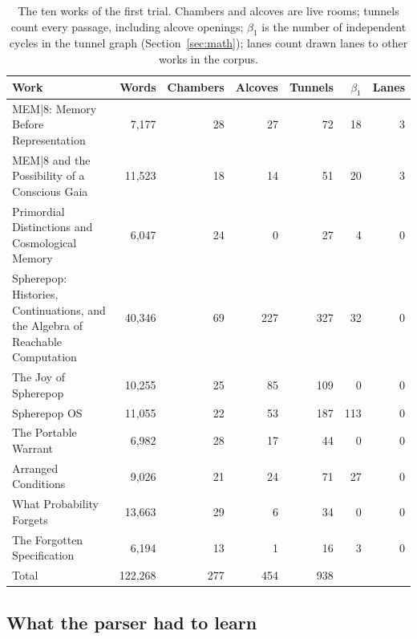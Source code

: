 \documentclass[11pt]{article}
\theoremstyle{remark}
\begin{document}
\begin{table}[htbp]
\centering\small
\begin{tabularx}{\linewidth}{>{\raggedright\arraybackslash}Xrrrrrr}
\toprule
Work & Words & Chambers & Alcoves & Tunnels & $\beta_1$ & Lanes \\
\midrule
MEM|8: Memory Before Representation & 7,177 & 28 & 27 & 72 & 18 & 3 \\
MEM|8 and the Possibility of a Conscious Gaia & 11,523 & 18 & 14 & 51 & 20 & 3 \\
Primordial Distinctions and Cosmological Memory & 6,047 & 24 & 0 & 27 & 4 & 0 \\
Spherepop: Histories, Continuations, and the Algebra of Reachable Computation & 40,346 & 69 & 227 & 327 & 32 & 0 \\
The Joy of Spherepop & 10,255 & 25 & 85 & 109 & 0 & 0 \\
Spherepop OS & 11,055 & 22 & 53 & 187 & 113 & 0 \\
The Portable Warrant & 6,982 & 28 & 17 & 44 & 0 & 0 \\
Arranged Conditions & 9,026 & 21 & 24 & 71 & 27 & 0 \\
What Probability Forgets & 13,663 & 29 & 6 & 34 & 0 & 0 \\
The Forgotten Specification & 6,194 & 13 & 1 & 16 & 3 & 0 \\
\midrule
Total & 122,268 & 277 & 454 & 938 & & \\
\bottomrule
\end{tabularx}
\caption{The ten works of the first trial. Chambers and alcoves are live rooms; tunnels count every passage, including alcove openings; $\beta_1$ is the number of independent cycles in the tunnel graph (Section~\ref{sec:math}); lanes count drawn lanes to other works in the corpus.}
\label{tab:trial}
\end{table}

\subsection{What the parser had to learn}
\end{document}
